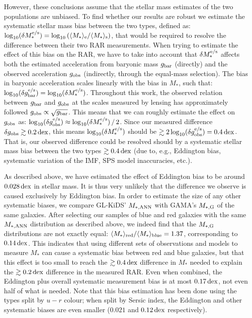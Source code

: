 \documentclass[usenatbib]{mnras}
\newcommand{\un}[1]{_{\rm #1}}
\newcommand{\dex}{\, {\rm dex}}
\begin{document}
However, these conclusions assume that the stellar mass estimates of the two populations are unbiased. To find whether our results are robust we estimate the systematic stellar mass bias between the two types, defined as: $\log_{10}(\delta M_*^{\rm e/s}) = \log_{10}\left( \langle M_*\rangle\un{e} / \langle M_*\rangle\un{s} \right)$, that would be required to resolve the difference between their two RAR measurements. When trying to estimate the effect of this bias on the RAR, we have to take into account that $\delta M^{\rm e/s}_*$ affects both the estimated acceleration from baryonic mass $g\un{bar}$ (directly) and the observed acceleration $g\un{obs}$ (indirectly, through the equal-mass selection). The bias in baryonic acceleration scales linearly with the bias in $M_*$, such that: $\log_{10}(\delta g^{\rm e/s}\un{bar}) = \log_{10}(\delta M^{\rm e/s}_*)$. Throughout this work, the observed relation between $g\un{bar}$ and $g\un{obs}$ at the scales measured by lensing has approximately followed $g\un{obs} \propto \sqrt{g\un{bar}}$. This means that we can roughly estimate the effect on $g\un{obs}$ as: $\log_{10}(\delta g^{\rm e/s}\un{obs}) \approx {\log_{10}(\delta M^{\rm e/s}_*)} \, / \, {2}$. Since our measured difference $\delta g\un{obs} \gtrsim 0.2 \dex$, this means ${\log_{10}(\delta M^{\rm e/s}_*)}$ should be  $\gtrsim 2 \log_{10}(\delta g^{\rm e/s}\un{obs}) = 0.4 \dex$. That is, our observed difference could be resolved should by a systematic stellar mass bias between the two types $\gtrsim 0.4 \dex$ (due to, e.g., Eddington bias, systematic variation of the IMF, SPS model inaccuracies, etc.).

As described above, we have estimated the effect of Eddington bias to be around $0.028 \dex$ in stellar mass. It is thus very unlikely that the difference we observe is caused exclusively by Eddington bias. In order to estimate the size of any other systematic biases, we compare GL-KiDS' $M\un{*,ANN}$ with GAMA's $M\un{*,G}$ of the same galaxies. After selecting our samples of blue and red galaxies with the same $M\un{*,ANN}$ distribution as described above, we indeed find that the $M\un{*,G}$ distributions are not exactly equal: $\langle M_* \rangle\un{red} / \langle M_*\rangle\un{blue} = 1.37$, corresponding to $0.14 \dex$. This indicates that using different sets of observations and models to measure $M_*$ can cause a systematic bias between red and blue galaxies, but that this effect is too small to reach the $\gtrsim 0.4 \dex$ difference in $M_*$ needed to explain the $\gtrsim 0.2 \dex$ difference in the measured RAR. Even when combined, the Eddington plus overall systematic measurement bias is at most $0.17 \dex$, not even half of what is needed. Note that this bias estimation has been done using the types split by $u-r$ colour; when split by Sersic index, the Eddington and other systematic biases are even smaller ($0.021$ and $0.12 \dex$ respectively).
\end{document}
